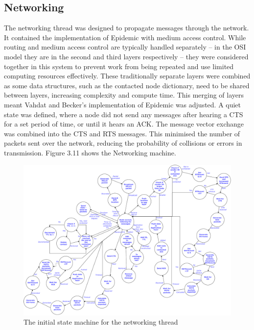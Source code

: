 \documentclass[12pt,a4paper]{report}
\begin{document}
\subsection{Networking}
The networking thread was designed to propagate messages through the network. It contained the implementation of Epidemic with medium access control. While routing and medium access control are typically handled separately -- in the OSI model they are in the second and third layers respectively -- they were considered together in this system to prevent work from being repeated and use limited computing resources effectively. These traditionally separate layers were combined as some data structures, such as the contacted node dictionary, need to be shared between layers, increasing complexity and compute time. This merging of layers meant Vahdat and Becker's implementation of Epidemic was adjusted. A quiet state was defined, where a node did not send any messages after hearing a CTS for a set period of time, or until it hears an ACK. The message vector exchange was combined into the CTS and RTS messages. This minimised the number of packets sent over the network, reducing the probability of collisions or errors in transmission.  Figure 3.11 shows the Networking machine.
\begin{figure}[h]
\begin{center}
\includegraphics[scale=0.4]{appLayer.pdf}
\end{center}
\caption{The initial state machine for the networking thread}
\end{figure}
\FloatBarrier
\end{document}
